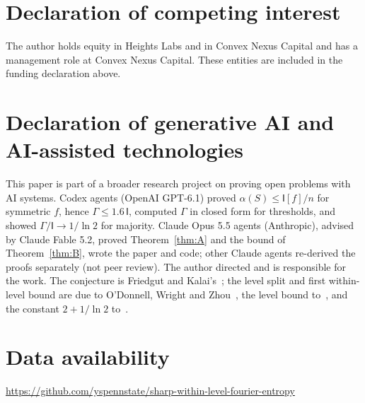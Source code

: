 \documentclass[11pt]{amsart}
\theoremstyle{remark}
\newcommand{\I}{\mathsf I}
\begin{document}
\section*{Declaration of competing interest}
The author holds equity in Heights Labs and in Convex Nexus Capital and
has a management role at Convex Nexus Capital. These entities are included
in the funding declaration above.

\section*{Declaration of generative AI and AI-assisted technologies}
This paper is part of a broader research project on proving open problems with AI systems. Codex agents (OpenAI GPT-6.1) proved $\alpha(S)\le\I[f]/n$ for symmetric $f$, hence $\Gamma\le1.6\,\I$, computed $\Gamma$ in closed form for thresholds, and showed $\Gamma/\I\to1/\ln2$ for majority. Claude Opus 5.5 agents (Anthropic), advised by Claude Fable 5.2, proved Theorem~\ref{thm:A} and the bound of Theorem~\ref{thm:B}, wrote the paper and code; other Claude agents re-derived the proofs separately (not peer review). The author directed and is responsible for the work. The conjecture is Friedgut and Kalai's~\cite{FK96}; the level split and first within-level bound are due to O'Donnell, Wright and Zhou~\cite[Theorem~4]{OWZ11}, the level bound to~\cite[Lemma~2.1]{Shm26}, and the constant $2+1/\ln2$ to~\cite{Shm26b}.

\section*{Data availability}
\url{https://github.com/yspennstate/sharp-within-level-fourier-entropy}
\end{document}
